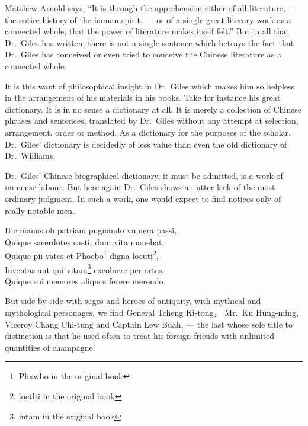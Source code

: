 Matthew Arnold  says, ``It is through the apprehension either of all literature, --- the entire history of the human spirit, --- or of a single great literary work as a connected whole, that the power of literature makes itself felt.''
But in all that Dr.~Giles has written, there is not a single sentence which betrays the fact that Dr.~Giles has conceived or even tried to conceive the Chinese literature as a connected whole.

It is this want of philosophical insight in Dr.~Giles which makes him so helpless in the arrangement of his materials in his books.
Take for instance his great dictionary.
It is in no sense a dictionary at all.
It is merely a collection of Chinese phrases and sentences, translated by Dr.~Giles without any attempt at selection, arrangement, order or method.
As a dictionary for the purposes of the scholar, Dr.~Giles' dictionary is decidedly of less value than even the old dictionary of Dr.~Williams.

Dr.~Giles' Chinese biographical dictionary, it must be admitted, is a work of immense labour.
But here again Dr.~Giles shows an utter lack of the most ordinary judgment.
In such a work, one would expect to find notices only of really notable men.
\begin{center}
    Hic manus ob patriam pugnando vulnera passi, \\
    Quique sacerdotes casti, dum vita manebat, \\
    Quique pii vates et Phoebo\footnote{Phxwbo in the original book} digna locuti\footnote{loctlti in the original book}, \\
    Inventas aut qui vitam\footnote{intam in the original book} excoluere per artes, \\
    Quique sui memores aliquos fecere merendo.
\end{center}

But side by side with sages and heroes of antiquity, with mythical and mythological personages, we find General Tcheng Ki-tong， Mr.~Ku Hung-ming, Viceroy Chang Chi-tung and Captain Lew Buah,  --- the last whose sole title to distinction is that he used often to treat his foreign friends with unlimited quantities of champagne!

